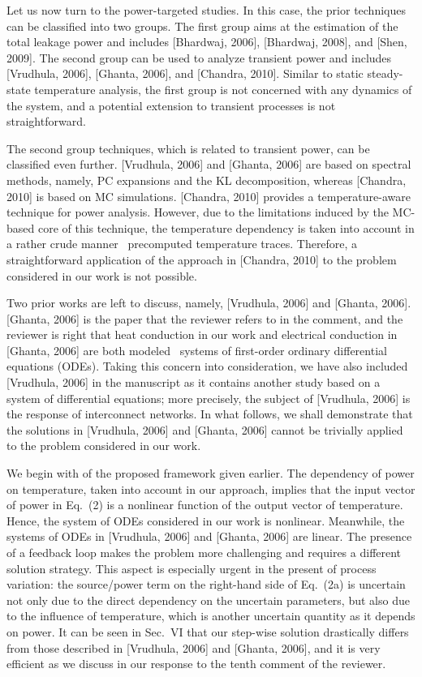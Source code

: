 \begin{authors}
Let us now turn to the power-targeted studies.
In this case, the prior techniques can be classified into two groups.
The first group aims at the estimation of the total leakage power and includes [Bhardwaj, 2006], [Bhardwaj, 2008], and [Shen, 2009].
The second group can be used to analyze transient power and includes [Vrudhula, 2006], [Ghanta, 2006], and [Chandra, 2010].
Similar to static steady-state temperature analysis, the first group is not concerned with any dynamics of the system, and a potential extension to transient processes is not straightforward.

The second group techniques, which is related to transient power, can be classified even further.
[Vrudhula, 2006] and [Ghanta, 2006] are based on spectral methods, namely, PC expansions and the KL decomposition, whereas [Chandra, 2010] is based on MC simulations.
[Chandra, 2010] provides a temperature-aware technique for power analysis.
However, due to the limitations induced by the MC-based core of this technique, the temperature dependency is taken into account in a rather crude manner \via\ precomputed temperature traces.
Therefore, a straightforward application of the approach in [Chandra, 2010] to the problem considered in our work is not possible.

Two prior works are left to discuss, namely, [Vrudhula, 2006] and [Ghanta, 2006].
[Ghanta, 2006] is the paper that the reviewer refers to in the comment, and the reviewer is right that heat conduction in our work and electrical conduction in [Ghanta, 2006] are both modeled \via\ systems of first-order ordinary differential equations (ODEs).
Taking this concern into consideration, we have also included [Vrudhula, 2006] in the manuscript as it contains another study based on a system of differential equations; more precisely, the subject of [Vrudhula, 2006] is the response of interconnect networks.
In what follows, we shall demonstrate that the solutions in [Vrudhula, 2006] and [Ghanta, 2006] cannot be trivially applied to the problem considered in our work.

We begin with  of the proposed framework given earlier.
The dependency of power on temperature, taken into account in our approach, implies that the input vector of power in Eq.~(2) is a nonlinear function of the output vector of temperature.
Hence, the system of ODEs considered in our work is nonlinear.
Meanwhile, the systems of ODEs in [Vrudhula, 2006] and [Ghanta, 2006] are linear.
The presence of a feedback loop makes the problem more challenging and requires a different solution strategy.
This aspect is especially urgent in the present of process variation: the source/power term on the right-hand side of Eq.~(2a) is uncertain not only due to the direct dependency on the uncertain parameters, but also due to the influence of temperature, which is another uncertain quantity as it depends on power.
It can be seen in Sec.~VI that our step-wise solution drastically differs from those described in [Vrudhula, 2006] and [Ghanta, 2006], and it is very efficient as we discuss in our response to the tenth comment of the reviewer.


\end{authors}
